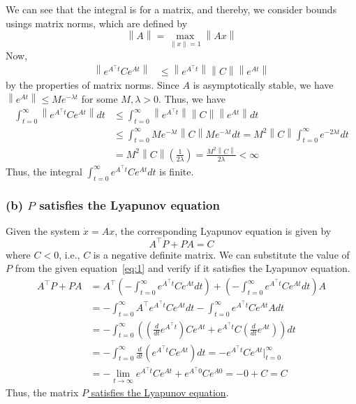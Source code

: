 We can see that the integral is for a matrix, and thereby, we consider bounds usings matrix norms, which are defined by
\begin{equation*}
    \left \| A \right \| = \max_{\left \| x \right \| = 1} \left \| A x \right \|
\end{equation*}
Now,
\begin{align*}
    \left \| e^{A^{\top} t} C e^{A t} \right \|
     & \leq
    \left \| e^{A^{\top} t} \right \| \left \| C \right \| \left \| e^{A t} \right \|
\end{align*}
by the properties of matrix norms.
Since \( A \) is asymptotically stable, we have \( \left \| e^{A t} \right \| \leq M e^{-\lambda t} \) for some \( M, \lambda > 0 \).
Thus, we have
\begin{align*}
    \int_{t=0}^{\infty} \left \| e^{A^{\top} t} C e^{A t} \right \| d t
     & \leq
    \int_{t=0}^{\infty} \left \| e^{A^{\top} t} \right \| \left \| C \right \| \left \| e^{A t} \right \| d t
    \\ & \leq
    \int_{t=0}^{\infty} M e^{-\lambda t} \left \| C \right \| M e^{-\lambda t} d t
    =
    M^2 \left \| C \right \| \int_{t=0}^{\infty} e^{-2 \lambda t} d t
    \\ & =
    M^2 \left \| C \right \| \left( \frac{1}{2 \lambda} \right)
    =
    \frac{M^2 \left \| C \right \|}{2 \lambda}
    <
    \infty
\end{align*}
Thus, the integral \( \displaystyle \int_{t=0}^{\infty} e^{A^{\top} t} C e^{A t} d t \) is finite.

\subsubsection*{(b) \( P \) satisfies the Lyapunov equation}

Given the system \( \dot x = A x \), the corresponding Lyapunov equation is given by
\begin{equation*}
    A^{\top} P + P A = C
\end{equation*}
where \( C < 0 \), i.e., \( C \) is a negative definite matrix.
We can substitute the value of \( P \) from the given equation~\eqref{eq:1} and verify if it satisfies the Lyapunov equation.
\begin{align*}
    A^\top P + P A
     & =
    A^\top \left( -\int_{t=0}^{\infty} e^{A^{\top} t} C e^{A t} d t \right) + \left( -\int_{t=0}^{\infty} e^{A^{\top} t} C e^{A t} d t \right) A
    \\ & =
    -\int_{t=0}^{\infty} A^\top e^{A^{\top} t} C e^{A t} d t - \int_{t=0}^{\infty} e^{A^{\top} t} C e^{A t} A d t
    \\ & =
    -\int_{t=0}^{\infty} \left( \left( \frac{d}{dt} e^{A^{\top} t} \right) C e^{A t} + e^{A^{\top} t} C \left( \frac{d}{dt} e^{A t} \right) \right) d t
    \\ & =
    -\int_{t=0}^{\infty} \frac{d}{dt} \left( e^{A^{\top} t} C e^{A t} \right) d t
    =
    - e^{A^{\top} t} C e^{A t} \Big|_{t=0}^{\infty}
    \\ & =
    - \lim_{t \to \infty} e^{A^{\top} t} C e^{A t} + e^{A^{\top} 0} C e^{A 0}
    =
    - 0 + C
    =
    C
\end{align*}
Thus, the matrix \underline{\( P \) satisfies the Lyapunov equation}.

